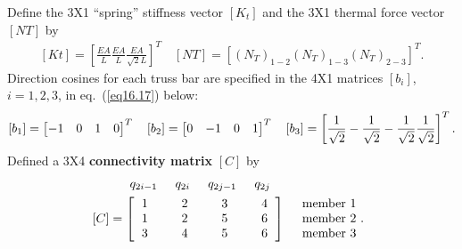 \documentclass{AeroStructure-ERJohnson}
\begin{document}
Define the 3X1 ``spring'' stiffness vector $[K_{t}]$ and the 3X1 thermal force vector $[N T]$ by
\begin{align}\label{eq16.16}
[K t]=\left[\frac{E A}{L} \frac{E A}{L} \frac{E A}{\sqrt{2} L}\right]^{T} \quad[N T]=\left[\left(N_{T}\right)_{1-2}\left(N_{T}\right)_{1-3}\left(N_{T}\right)_{2-3}\right]^{T}.
\end{align}
Direction cosines for each truss bar are specified in the 4X1 matrices $\left[b_{i}\right]$, $i=1,2,3$, in eq.~(\ref{eq16.17}) below:\pagebreak
\begin{align}\label{eq16.17}
\left[b_{1}\right]=\left[\begin{array}{@{}llll@{}}-1 & 0 & 1 & 0\end{array}\right]^{T} \quad\left[b_{2}\right]=\left[\begin{array}{@{}llll@{}}0 & -1 & 0 & 1\end{array}\right]^{T} \quad\left[b_{3}\right]=\left[\frac{1}{\sqrt{2}}-\frac{1}{\sqrt{2}}-\frac{1}{\sqrt{2}} \frac{1}{\sqrt{2}}\right]^{T}.
\end{align}
Defined a 3X4 \textbf{connectivity matrix} $[C]$ by\vspace*{-0.6pc}
\begin{align}\label{eq16.18}
&\hspace*{2.5pc}q_{2 i-1} \hspace*{1.2pc} q_{2 i} \hspace*{1.2pc} q_{2 j-1} \hspace*{1.2pc} q_{2 j} \nonumber\\
&[C]=
{\arraycolsep=13.5pt\left[\begin{array}{@{\hspace*{6pt}}cccc@{\hspace*{6pt}}}
1 & 2 & 3 & 4 \\
1 & 2 & 5 & 6 \\
3 & 4 & 5 & 6\end{array}\right]} \quad \begin{array}{l}\text {member 1 } \\\text {member 2}\ . \\\text {member 3 }\end{array}
\end{align}
\end{document}
